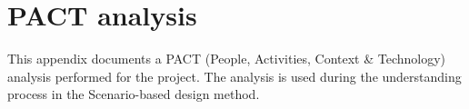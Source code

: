 \section{PACT analysis} \label{PACTAnalysis}
This appendix documents a PACT (People, Activities, Context \& Technology) analysis performed for the project. The analysis is used during the understanding process in the Scenario-based design method.